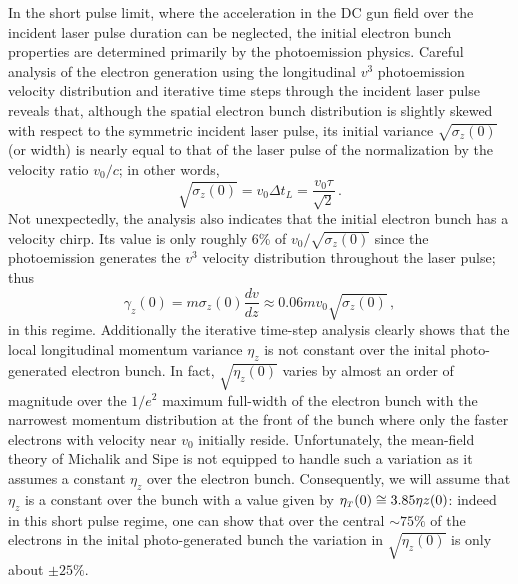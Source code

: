 In the short pulse limit, where the acceleration in the DC gun field over the incident laser pulse duration can be neglected, the initial electron bunch properties are determined primarily by the photoemission physics.
Careful analysis of the electron generation using the longitudinal $ v^{3} $ photoemission velocity distribution %
and iterative time steps through the incident laser pulse reveals that, although the spatial electron bunch distribution is slightly skewed with respect to the symmetric incident laser pulse, its initial variance $ \sqrt{ \sigma_{ z } ( 0 ) } $ (or width) is nearly equal to that of the laser pulse of the normalization by the velocity ratio $ v_{ 0 }/c $; in other words,
\begin{equation} \label{eq:initial_sigma_z}
\sqrt{ \sigma_{ z } ( 0 ) } = v_{ 0 } \Delta t_{L} = \frac{ v_{ 0 } \tau }{ \sqrt{ 2 } } \, \text{.}
\end{equation}
Not unexpectedly, the analysis also indicates that the initial electron bunch has a velocity chirp.
Its value is only roughly 6\% of $ v_{ 0 }/\sqrt{ \sigma_{z} ( 0 ) } $ since the photoemission generates the $ v^{ 3 } $ velocity distribution throughout the laser pulse; thus 
\begin{equation}
\gamma_{ z } ( 0 ) = m \sigma_{ z } ( 0 ) \frac{ d v }{ d z } \approx 0.06 m v_{ 0 } \sqrt{ \sigma_{ z } ( 0 ) } \, ,
\end{equation}
in this regime.
Additionally the iterative time-step analysis clearly shows that the local longitudinal momentum variance $ \eta_{ z } $ is not constant over the inital photo-generated electron bunch.
In fact, $ \sqrt{ \eta_{ z } ( 0 ) } $ varies by almost an order of magnitude over the $ 1/e^{2} $ maximum full-width of the electron bunch with the narrowest momentum distribution at the front of the bunch where only the faster electrons with velocity near $ v_{ 0 } $ initially reside.
Unfortunately, the mean-field theory of Michalik and Sipe \cite{michalik_analytic_2006} is not equipped to handle such a variation as it assumes a constant $ \eta_{ z } $ over the electron bunch.
Consequently, we will assume that $ \eta_{ z } $ is a constant over the bunch with a value given by $ \eta_{{\scriptscriptstyle T} } ( 0 ) \cong 3.85 \eta{ z } ( 0 ) $: %
indeed in this short pulse regime, one can show that over the central $ \sim 75 \% $ of the electrons in the inital photo-generated bunch the variation in $ \sqrt{ \eta_{ z } ( 0 ) } $ is only about $ \pm 25 \% $.

